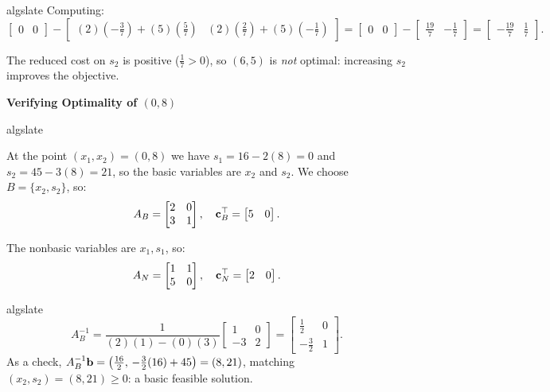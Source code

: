 \begin{solution}
\begin{steppanel}{algslate}
Computing:
\[
\begin{bmatrix}
    0 & 0
\end{bmatrix}
-
\begin{bmatrix}
    (2)(-\tfrac37) + (5)(\tfrac57) & (2)(\tfrac27) + (5)(-\tfrac17)
\end{bmatrix}
=
\begin{bmatrix}
    0 & 0
\end{bmatrix}
-
\begin{bmatrix}
    \tfrac{19}{7} & -\tfrac17
\end{bmatrix}
=
\begin{bmatrix}
    -\tfrac{19}{7} & \tfrac17
\end{bmatrix}.
\]

The reduced cost on $s_2$ is positive ($\tfrac17 > 0$), so \( (6,5) \) is \emph{not} optimal: increasing $s_2$ improves the objective.
\end{steppanel}

\textbf{Verifying Optimality of \( (0,8) \)}

\begin{steppanel}{algslate}

At the point $(x_1, x_2) = (0,8)$ we have $s_1 = 16 - 2(8) = 0$ and $s_2 = 45 - 3(8) = 21$, so the basic variables are $x_2$ and $s_2$.  We choose \(B= \{x_2, s_2\} \), so:
\[
A_B =
\begin{bmatrix}
    2 & 0 \\
    3 & 1
\end{bmatrix}, \quad
\mathbf{c}_B^\top =
\begin{bmatrix}
    5 & 0
\end{bmatrix}.
\]

The nonbasic variables are \( x_1, s_1 \), so:
\[
A_N =
\begin{bmatrix}
    1 & 1 \\
    5 & 0
\end{bmatrix}, \quad
\mathbf{c}_N^\top =
\begin{bmatrix}
    2 & 0
\end{bmatrix}.
\]

\end{steppanel}
\begin{steppanel}{algslate}
\[
A_B^{-1} =
\frac{1}{(2)(1) - (0)(3)}
\begin{bmatrix}
    1 & 0 \\
    -3 & 2
\end{bmatrix}
=
\begin{bmatrix}
    \tfrac12 & 0 \\
    -\tfrac32 & 1
\end{bmatrix}.
\]
As a check, $A_B^{-1}\mathbf{b} = \left(\tfrac{16}{2},\, -\tfrac{3}{2}(16) + 45\right) = (8, 21)$, matching $(x_2, s_2) = (8, 21) \geq 0$: a basic feasible solution.


\end{steppanel}
\end{solution}
